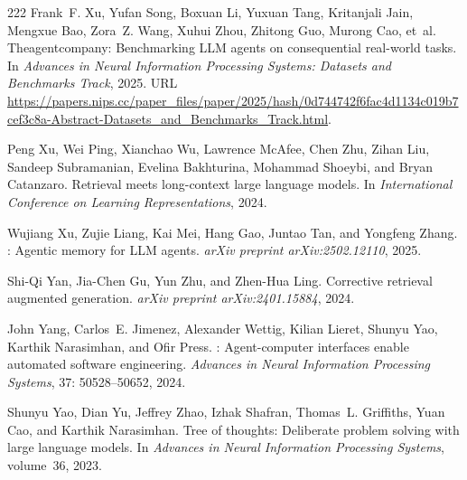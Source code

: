 \begin{thebibliography}{222}
Frank~F. Xu, Yufan Song, Boxuan Li, Yuxuan Tang, Kritanjali Jain, Mengxue Bao,
  Zora~Z. Wang, Xuhui Zhou, Zhitong Guo, Murong Cao, et~al.
\newblock Theagentcompany: Benchmarking {LLM} agents on consequential
  real-world tasks.
\newblock In \emph{Advances in Neural Information Processing Systems: Datasets
  and Benchmarks Track}, 2025{}.
\newblock URL
  \url{https://papers.nips.cc/paper_files/paper/2025/hash/0d744742f6fac4d1134c019b7cef3c8a-Abstract-Datasets_and_Benchmarks_Track.html}.

Peng Xu, Wei Ping, Xianchao Wu, Lawrence McAfee, Chen Zhu, Zihan Liu, Sandeep
  Subramanian, Evelina Bakhturina, Mohammad Shoeybi, and Bryan Catanzaro.
\newblock Retrieval meets long-context large language models.
\newblock In \emph{International Conference on Learning Representations},
  2024{}.

Wujiang Xu, Zujie Liang, Kai Mei, Hang Gao, Juntao Tan, and Yongfeng Zhang.
: Agentic memory for {LLM} agents.
\newblock \emph{arXiv preprint arXiv:2502.12110}, 2025{}.

Shi-Qi Yan, Jia-Chen Gu, Yun Zhu, and Zhen-Hua Ling.
\newblock Corrective retrieval augmented generation.
\newblock \emph{arXiv preprint arXiv:2401.15884}, 2024.

John Yang, Carlos~E. Jimenez, Alexander Wettig, Kilian Lieret, Shunyu Yao,
  Karthik Narasimhan, and Ofir Press.
: Agent-computer interfaces enable automated software
  engineering.
\newblock \emph{Advances in Neural Information Processing Systems},
  37: 50528--50652, 2024.

Shunyu Yao, Dian Yu, Jeffrey Zhao, Izhak Shafran, Thomas~L. Griffiths, Yuan
  Cao, and Karthik Narasimhan.
\newblock Tree of thoughts: Deliberate problem solving with large language
  models.
\newblock In \emph{Advances in Neural Information Processing Systems},
  volume~36, 2023{}.


\end{thebibliography}
